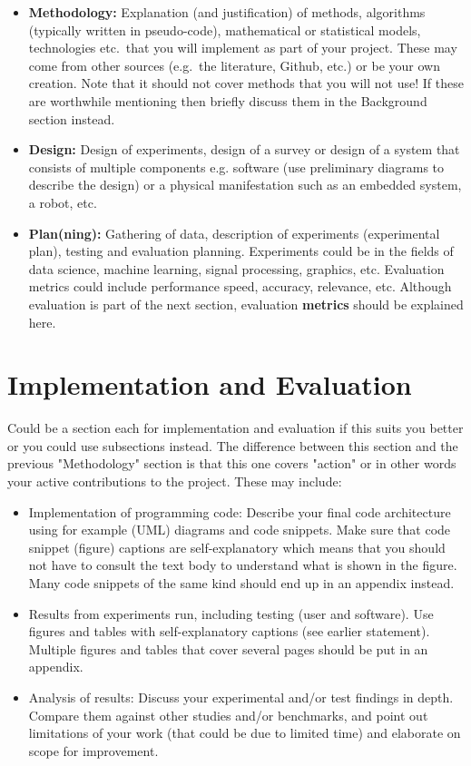 \documentclass[final]{cmpreport_02}
\begin{document}
\begin{itemize}
\item \textbf{Methodology: } Explanation (and justification) of methods, algorithms (typically written in pseudo-code), mathematical or statistical models, technologies etc.\ that you will implement as part of your project. These may come from other sources (e.g.\ the literature, Github, etc.) or be your own creation. Note that it should not cover methods that you will not use! If these are worthwhile mentioning then briefly discuss them in the Background section instead.
\item \textbf{Design: } Design of experiments, design of a survey or design of a system that consists of multiple components e.g. software (use preliminary diagrams to describe the design) or a physical manifestation such as an embedded system, a robot, etc.
\item \textbf{Plan(ning): } Gathering of data, description of experiments (experimental plan), testing and evaluation planning. Experiments could be in the fields of data science, machine learning, signal processing, graphics, etc. Evaluation metrics could include performance speed, accuracy, relevance, etc. Although evaluation is part of the next section, evaluation \textbf{metrics} should be explained here.
\end{itemize}

\section{Implementation and Evaluation}

Could be a section each for implementation and evaluation if this suits you better or you could use subsections instead. The difference between this section and the previous "Methodology" section is that this one covers "action" or in other words your active contributions to the project. These may include:
\begin{itemize}
\item Implementation of programming code: Describe your final code architecture using for example (UML) diagrams and code snippets. Make sure that code snippet (figure) captions are self-explanatory which means that you should not have to consult the text body to understand what is shown in the figure. Many code snippets of the same kind should end up in an appendix instead.
\item Results from experiments run, including testing (user and software). Use figures and tables with self-explanatory captions (see earlier statement). Multiple figures and tables that cover several pages should be put in an appendix.
\item Analysis of results: Discuss your experimental and/or test findings in depth. Compare them against other studies and/or benchmarks, and point out limitations of your work (that could be due to limited time) and elaborate on scope for improvement.
\end{itemize}
\end{document}
